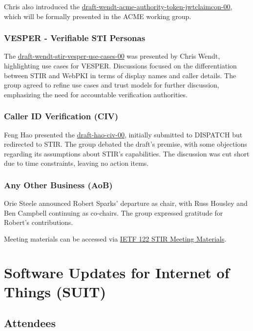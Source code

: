 \documentclass{article}
\begin{document}
Chris also introduced the \href{https://datatracker.ietf.org/doc/html/draft-wendt-acme-authority-token-jwtclaimcon-00}{draft-wendt-acme-authority-token-jwtclaimcon-00}, which will be formally presented in the ACME working group.

\subsubsection{VESPER - Verifiable STI Personas}
The \href{https://datatracker.ietf.org/doc/html/draft-wendt-stir-vesper-use-cases-00}{draft-wendt-stir-vesper-use-cases-00} was presented by Chris Wendt, highlighting use cases for VESPER. Discussions focused on the differentiation between STIR and WebPKI in terms of display names and caller details. The group agreed to refine use cases and trust models for further discussion, emphasizing the need for accountable verification authorities.

\subsubsection{Caller ID Verification (CIV)}
Feng Hao presented the \href{https://datatracker.ietf.org/doc/html/draft-hao-civ-00}{draft-hao-civ-00}, initially submitted to DISPATCH but redirected to STIR. The group debated the draft's premise, with some objections regarding its assumptions about STIR's capabilities. The discussion was cut short due to time constraints, leaving no action items.

\subsubsection{Any Other Business (AoB)}
Orie Steele announced Robert Sparks' departure as chair, with Russ Housley and Ben Campbell continuing as co-chairs. The group expressed gratitude for Robert's contributions.

Meeting materials can be accessed via \href{https://www.ietf.org/proceedings/122/stir.html}{IETF 122 STIR Meeting Materials}.




\newpage

\section{Software Updates for Internet of Things (SUIT)}

\subsection{Attendees}
\end{document}
